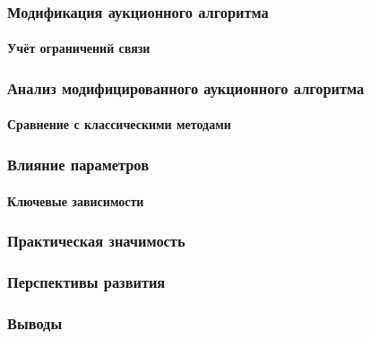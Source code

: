 \documentclass{beamer}
\begin{document}
	
	\begin{frame}
		\frametitle{Модификация аукционного алгоритма}
		\framesubtitle{Учёт ограничений связи}
	\end{frame}
	
	\begin{frame}
		\frametitle{Анализ модифицированного аукционного алгоритма}
		\framesubtitle{Сравнение с классическими методами}
	\end{frame}
	
	
	\begin{frame}
		\frametitle{Влияние параметров}
		\framesubtitle{Ключевые зависимости}
	\end{frame}
	
	\begin{frame}
		\frametitle{Практическая значимость}
	\end{frame}
	
	\begin{frame}
		\frametitle{Перспективы развития}
	\end{frame}
	
	\begin{frame}
		\frametitle{Выводы}
	\end{frame}
	
\end{document}
